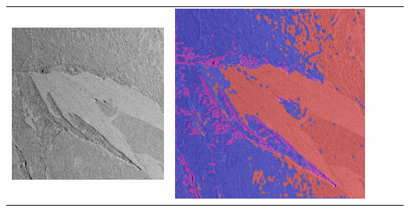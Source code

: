 \begin{table}[h!]
\begin{tabularx}{\textwidth}{>{\centering}m{}
			>{\centering}m{}
			>{\centering}m{}
			>{\centering}m{}
			>{\centering\arraybackslash}m{}}
		\includegraphics[width=0.9\linewidth]{images/p03/p03_03.png} &
		\includegraphics[width=0.9\linewidth]{images/gen/pooling_layers/p03_03.png_1.png} &

\end{tabularx}
\end{table}

